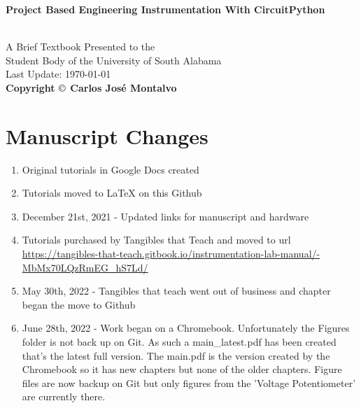 \documentclass{article}
\begin{document}
\begin{center}
\begin{LARGE}{\bf Project Based Engineering Instrumentation With CircuitPython}\end{LARGE}\\
\large
\vspace{22 mm}
   A Brief Textbook Presented to the \\ 
   Student Body of the University of South Alabama \\
\vspace{22 mm}
\vspace{22 mm}
\vspace{22 mm}
       Last Update: \today\\
{\bf Copyright $\copyright$ Carlos Jos\'{e} Montalvo}
\end{center}

\linespread{1}

\newpage

\section*{Manuscript Changes}

\begin{enumerate}[itemsep=-5pt]
\item Original tutorials in Google Docs created
\item Tutorials moved to LaTeX on this Github
\item December 21st, 2021 - Updated links for manuscript and hardware
\item Tutorials purchased by Tangibles that Teach and moved to url \url{https://tangibles-that-teach.gitbook.io/instrumentation-lab-manual/-MbMx70LQzRmEG_hS7Ld/}
\item May 30th, 2022 - Tangibles that teach went out of business and
  chapter began the move to Github
\item June 28th, 2022 - Work began on a Chromebook. Unfortunately the Figures folder is not back up on Git. As such a main\_latest.pdf has been created that's the latest full version. The main.pdf is the version created by the Chromebook so it has new chapters but none of the older chapters. Figure files are now backup on Git but only figures from the 'Voltage Potentiometer' are currently there.
\end{enumerate}
\end{document}
